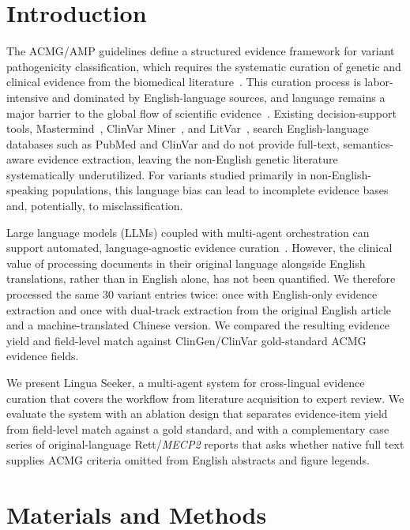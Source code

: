 \documentclass[preprint,12pt]{elsarticle}
\begin{document}
\section{Introduction}

The ACMG/AMP guidelines define a structured evidence framework for
variant pathogenicity classification, which requires the systematic
curation of genetic and clinical evidence from the biomedical
literature~\cite{richards2015,tavtigian2018,harrison2019}. This curation
process is labor-intensive and dominated by English-language sources, and
language remains a major barrier to the global flow of scientific
evidence~\cite{amano2016}. Existing decision-support tools,
Mastermind~\cite{chunn2020}, ClinVar Miner~\cite{henrie2018}, and
LitVar~\cite{allot2018}, search English-language databases such as
PubMed and ClinVar and do not provide full-text, semantics-aware evidence
extraction, leaving the non-English genetic literature systematically
underutilized. For variants studied primarily in non-English-speaking
populations, this language bias can lead to incomplete evidence bases
and, potentially, to misclassification.

Large language models (LLMs) coupled with multi-agent orchestration can
support automated, language-agnostic evidence curation~\cite{singhal2023}.
However, the clinical value of processing documents in their original
language alongside English translations, rather than in English alone,
has not been quantified. We therefore processed the same 30 variant
entries twice: once with English-only evidence extraction and once with
dual-track extraction from the original English article and a
machine-translated Chinese version. We compared the resulting evidence
yield and field-level match against ClinGen/ClinVar gold-standard ACMG
evidence fields.

We present Lingua Seeker, a multi-agent system for cross-lingual evidence
curation that covers the workflow from literature acquisition to expert
review. We evaluate the system with an ablation design that separates
evidence-item yield from field-level match against a gold standard, and
with a complementary case series of original-language Rett/\textit{MECP2}
reports that asks whether native full text supplies ACMG criteria omitted
from English abstracts and figure legends.

\section{Materials and Methods}
\end{document}
